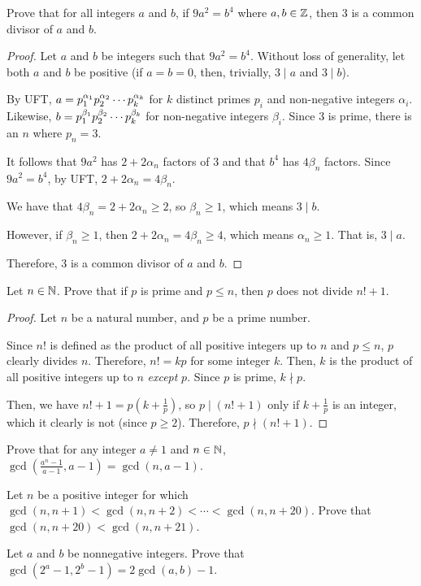 \documentclass{agony}
\begin{document}
\question Prove that for all integers $a$ and $b$,
if $9a^2 = b^4$ where $a,b\in\mathbb{Z}$, then 3 is a common divisor of $a$ and $b$.
\begin{proof}
  Let $a$ and $b$ be integers such that $9a^2=b^4$.
  Without loss of generality, let both $a$ and $b$ be positive
  (if $a=b=0$, then, trivially, $3 \mid a$ and $3 \mid b$).

  By UFT, $a=\pf{\alpha_#1}{k}$ for $k$ distinct primes $p_i$ and non-negative integers $\alpha_i$.
  Likewise, $b=\pf{\beta_#1}{k}$ for non-negative integers $\beta_i$.
  Since 3 is prime, there is an $n$ where $p_n=3$.

  It follows that $9a^2$ has $2+2\alpha_n$ factors of 3 and that $b^4$ has $4\beta_n$ factors.
  Since $9a^2=b^4$, by UFT, $2+2\alpha_n=4\beta_n$.

  We have that $4\beta_n = 2+2\alpha_n \geq 2$, so $\beta_n \geq 1$, which means $3 \mid b$.

  However, if $\beta_n \geq 1$, then $2+2\alpha_n = 4\beta_n \geq 4$, which means $\alpha_n \geq 1$.
  That is, $3 \mid a$.

  Therefore, 3 is a common divisor of $a$ and $b$.
\end{proof}


\question Let $n\in\mathbb{N}$. Prove that if $p$ is prime and $p \leq n$, then $p$ does not divide $n! + 1$.
\begin{proof}
  Let $n$ be a natural number, and $p$ be a prime number.

  Since $n!$ is defined as the product of all positive integers up to $n$ and $p \leq n$, $p$ clearly divides $n$.
  Therefore, $n! = kp$ for some integer $k$.
  Then, $k$ is the product of all positive integers up to $n$ \emph{except} $p$.
  Since $p$ is prime, $k \nmid p$.

  Then, we have $n!+1 = p(k+\frac{1}{p})$, so $p \mid (n!+1)$ only if $k+\frac{1}{p}$ is an integer,
  which it clearly is not (since $p \geq 2$).
  Therefore, $p \nmid (n!+1)$.
\end{proof}



\question Prove that for any integer $a \neq 1$ and $n\in\mathbb{N}$,
$\gcd\left( \frac{a^n-1}{a-1}, a-1 \right) = \gcd(n, a-1)$.

\question Let $n$ be a positive integer for which
$\gcd(n, n + 1) < \gcd(n, n + 2) < \cdots < {\gcd(n, n + 20)}$.
Prove that $\gcd(n, n + 20) < \gcd(n, n + 21)$.

\question Let $a$ and $b$ be nonnegative integers.
Prove that $\gcd(2^a - 1, 2^b - 1) = 2\gcd(a,b) - 1$.
\end{document}

